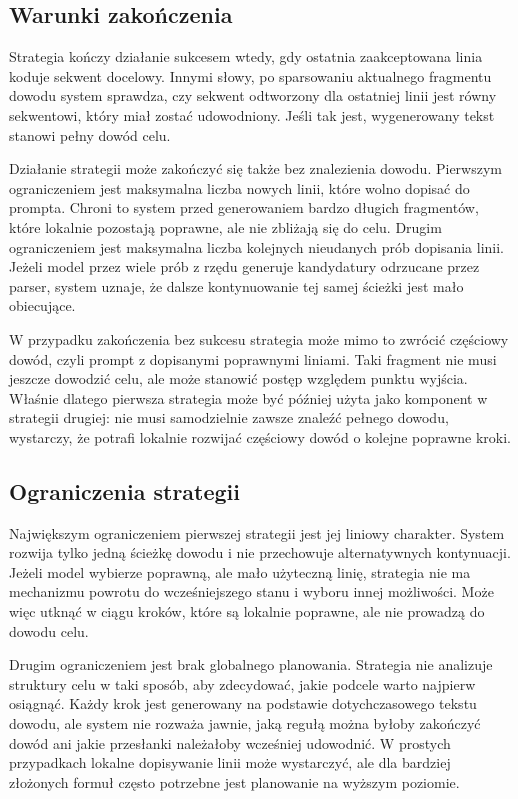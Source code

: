 \documentclass[shortabstract]{iithesis}
\theoremstyle{definition}
\theoremstyle{remark}
\theoremstyle{plain}
\begin{document}
\subsection{Warunki zakończenia}

Strategia kończy działanie sukcesem wtedy, gdy ostatnia zaakceptowana linia koduje
sekwent docelowy. Innymi słowy, po sparsowaniu aktualnego fragmentu dowodu system
sprawdza, czy sekwent odtworzony dla ostatniej linii jest równy sekwentowi, który
miał zostać udowodniony. Jeśli tak jest, wygenerowany tekst stanowi pełny dowód
celu.

Działanie strategii może zakończyć się także bez znalezienia dowodu. Pierwszym
ograniczeniem jest maksymalna liczba nowych linii, które wolno dopisać do prompta.
Chroni to system przed generowaniem bardzo długich fragmentów, które lokalnie
pozostają poprawne, ale nie zbliżają się do celu. Drugim ograniczeniem jest maksymalna
liczba kolejnych nieudanych prób dopisania linii. Jeżeli model przez wiele prób
z rzędu generuje kandydatury odrzucane przez parser, system uznaje, że dalsze
kontynuowanie tej samej ścieżki jest mało obiecujące.

W przypadku zakończenia bez sukcesu strategia może mimo to zwrócić częściowy
dowód, czyli prompt z dopisanymi poprawnymi liniami. Taki fragment nie musi jeszcze
dowodzić celu, ale może stanowić postęp względem punktu wyjścia. Właśnie dlatego
pierwsza strategia może być później użyta jako komponent w strategii drugiej:
nie musi samodzielnie zawsze znaleźć pełnego dowodu, wystarczy, że potrafi lokalnie
rozwijać częściowy dowód o kolejne poprawne kroki.

\subsection{Ograniczenia strategii}

Największym ograniczeniem pierwszej strategii jest jej liniowy charakter. System
rozwija tylko jedną ścieżkę dowodu i nie przechowuje alternatywnych kontynuacji.
Jeżeli model wybierze poprawną, ale mało użyteczną linię, strategia nie ma mechanizmu
powrotu do wcześniejszego stanu i wyboru innej możliwości. Może więc utknąć w
ciągu kroków, które są lokalnie poprawne, ale nie prowadzą do dowodu celu.

Drugim ograniczeniem jest brak globalnego planowania. Strategia nie analizuje
struktury celu w taki sposób, aby zdecydować, jakie podcele warto najpierw osiągnąć.
Każdy krok jest generowany na podstawie dotychczasowego tekstu dowodu, ale system
nie rozważa jawnie, jaką regułą można byłoby zakończyć dowód ani jakie przesłanki
należałoby wcześniej udowodnić. W prostych przypadkach lokalne dopisywanie linii
może wystarczyć, ale dla bardziej złożonych formuł często potrzebne jest planowanie
na wyższym poziomie.
\end{document}
